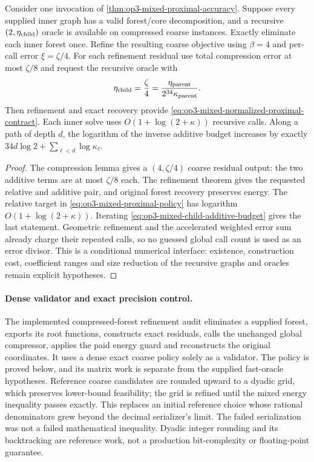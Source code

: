 \begin{corollary}
\label{cor:op3-mixed-recursive-budgets}
Consider one invocation of \cref{thm:op3-mixed-proximal-accuracy}.
Suppose every supplied inner graph has a valid forest/core decomposition,
and a recursive $(2,\eta_{\rm child})$ oracle is available on compressed
coarse instances. Exactly eliminate each inner forest once. Refine the
resulting coarse objective using $\beta=4$ and per-call error $\xi=\zeta/4$.
For each refinement residual use total compression error at most $\zeta/8$
and request the recursive oracle with
\begin{equation}
 \eta_{\rm child}=\frac\zeta4
                 =\frac{\eta_{\rm parent}}{2^{34}\kappa_{\rm parent}}.
 \label{eq:op3-mixed-child-additive-budget}
\end{equation}
Then refinement and exact recovery provide
\eqref{eq:op3-mixed-normalized-proximal-contract}.
Each inner solve uses $O(1+\log(2+\kappa))$ recursive calls. Along a
path of depth $d$, the logarithm of the inverse additive budget increases
by exactly $34d\log2+\sum_{\ell<d}\log\kappa_\ell$.
\end{corollary}
\begin{proof}
The compression lemma gives a $(4,\zeta/4)$ coarse residual output:
the two additive terms are at most $\zeta/8$ each.
The refinement theorem gives the requested relative and additive pair,
and original forest recovery preserves energy. The relative target in
\eqref{eq:op3-mixed-proximal-policy} has logarithm
$O(1+\log(2+\kappa))$. Iterating
\eqref{eq:op3-mixed-child-additive-budget} gives the last statement.
Geometric refinement and the accelerated weighted error sum already charge
their repeated calls, so no guessed global call count is used as an error
divisor. This is a conditional numerical interface: existence, construction
cost, coefficient ranges and size reduction of the recursive graphs and
oracles remain explicit hypotheses.
\end{proof}

\paragraph{Dense validator and exact precision control.}
The implemented compressed-forest refinement audit
eliminates a supplied forest, exports its root functions, constructs exact
residuals, calls the unchanged global compressor, applies the paid energy
guard and reconstructs the original coordinates. It uses a dense exact
coarse policy solely as a validator. The policy is proved below, and its
matrix work is separate from the supplied fast-oracle hypotheses.
Reference coarse candidates are rounded upward to a dyadic grid, which
preserves lower-bound feasibility; the grid is refined until the mixed
energy inequality passes exactly. This replaces an initial reference
choice whose rational denominators grew beyond the decimal serializer's
limit. The failed serialization was not a failed mathematical inequality.
Dyadic integer rounding and its backtracking are reference work, not a
production bit-complexity or floating-point guarantee.


